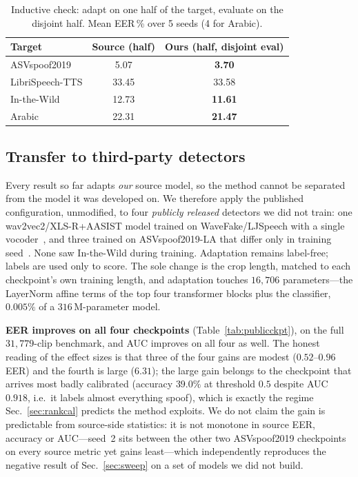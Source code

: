 \documentclass[conference]{IEEEtran}
\begin{document}
\begin{table}[t]
\centering
\caption{Inductive check: adapt on one half of the target, evaluate on the
disjoint half. Mean EER\,\% over 5 seeds (4 for Arabic).}
\label{tab:inductive}
\begin{tabular}{@{}lcc@{}}
\toprule
Target & Source (half) & Ours (half, disjoint eval) \\
\midrule
ASVspoof2019 & 5.07 & \textbf{3.70} \\
LibriSpeech-TTS & 33.45 & 33.58 \\
In-the-Wild & 12.73 & \textbf{11.61} \\
Arabic & 22.31 & \textbf{21.47} \\
\bottomrule
\end{tabular}
\end{table}

\subsection{Transfer to third-party detectors}
\label{sec:publicckpt}
Every result so far adapts \emph{our} source model, so the method cannot be
separated from the model it was developed on. We therefore apply the published
configuration, unmodified, to four \emph{publicly released} detectors we did not
train: one wav2vec2/XLS-R+AASIST model trained on WaveFake/LJSpeech with a single
vocoder~\cite{shiftyspeech}, and three trained on ASVspoof2019-LA that differ
only in training seed~\cite{deepfensehf}. None saw In-the-Wild during training.
Adaptation remains label-free; labels are used only to score. The sole change is
the crop length, matched to each checkpoint's own training length, and adaptation
touches $16{,}706$ parameters---the LayerNorm affine terms of the top four
transformer blocks plus the classifier, $0.005\%$ of a $316$\,M-parameter model.

\textbf{EER improves on all four checkpoints} (Table~\ref{tab:publicckpt}), on
the full $31{,}779$-clip benchmark, and AUC improves on all four as well. The
honest reading of the effect sizes is that three of the four gains are modest
($0.52$--$0.96$ EER) and the fourth is large ($6.31$); the large gain belongs to
the checkpoint that arrives most badly calibrated (accuracy $39.0\%$ at threshold
$0.5$ despite AUC $0.918$, i.e.\ it labels almost everything spoof), which is
exactly the regime Sec.~\ref{sec:rankcal} predicts the method exploits. We do not
claim the gain is predictable from source-side statistics: it is not monotone in
source EER, accuracy or AUC---seed~2 sits between the other two ASVspoof2019
checkpoints on every source metric yet gains least---which independently
reproduces the negative result of Sec.~\ref{sec:sweep} on a set of models we did
not build.
\end{document}
